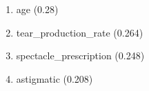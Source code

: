 \begin{enumerate}
\item age (0.28)
\item tear\_production\_rate (0.264)
\item spectacle\_prescription (0.248)
\item astigmatic (0.208)
\end{enumerate}